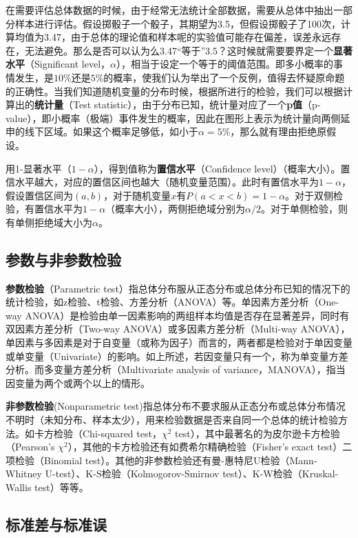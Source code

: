 \documentclass[11pt]{article}
\begin{document}
在需要评估总体数据的时候，由于经常无法统计全部数据，需要从总体中抽出一部分样本进行评估。假设掷骰子一个骰子，其期望为3.5，但假设掷骰子了100次，计算均值为3.47，由于总体的理论值和样本呢的实验值可能存在偏差，误差永远存在，无法避免。那么是否可以认为么3.47“等于”3.5？这时候就需要要界定一个\textbf{显著水平}（Significant level，$\alpha$），相当于设定一个等于的阈值范围。即多小概率的事情发生，是$10\%$还是$5\%$的概率，使我们认为举出了一个反例，值得去怀疑原命题的正确性。当我们知道随机变量的分布时候，根据所进行的检验，我们可以根据计算出的\textbf{统计量}（Test statistic），由于分布已知，统计量对应了一个\textbf{p值}（p-value），即小概率（极端）事件发生的概率，因此在图形上表示为统计量向两侧延申的线下区域。如果这个概率足够低，如小于$\alpha=5\%$，那么就有理由拒绝原假设。

用1-显著水平（$1-\alpha$），得到值称为\textbf{置信水平}（Confidence level）（概率大小）。置信水平越大，对应的置信区间也越大（随机变量范围）。此时有置信水平为$1-\alpha$，假设置信区间为$(a,b)$，对于随机变量$x$有$P(a<x<b)=1-\alpha$。对于双侧检验，有置信水平为$1-\alpha$（概率大小），两侧拒绝域分别为$\alpha/2$。对于单侧检验，则有单侧拒绝域大小为$\alpha$。

\subsection{参数与非参数检验}

\textbf{参数检验}（Parametric test）指总体分布服从正态分布或总体分布已知的情况下的统计检验，如z检验、t检验、方差分析（ANOVA）等。单因素方差分析（One-way ANOVA）是检验由单一因素影响的两组样本均值是否存在显著差异，同时有双因素方差分析（Two-way ANOVA）或多因素方差分析（Multi-way ANOVA），单因素与多因素是对于自变量（或称为因子）而言的，两者都是检验对于单因变量或单变量（Univariate）的影响。如上所述，若因变量只有一个，称为单变量方差分析。而多变量方差分析（Multivariate analysis of variance，MANOVA），指当因变量为两个或两个以上的情形。

\textbf{非参数检验}(Nonparametric test)指总体分布不要求服从正态分布或总体分布情况不明时（未知分布、样本太少），用来检验数据是否来自同一个总体的统计检验方法。如卡方检验（Chi-squared test，$\chi^2$ test），其中最著名的为皮尔逊卡方检验（Pearson's $\chi^2$），其他的卡方检验还有如费希尔精确检验（Fisher's exact test）二项检验（Binomial test）。其他的非参数检验还有曼-惠特尼U检验（Mann-Whitney U-test）、K-S检验（Kolmogorov-Smirnov test）、K-W检验（Kruskal-Wallis test）等等。

\subsection{标准差与标准误}
    
\end{document}
